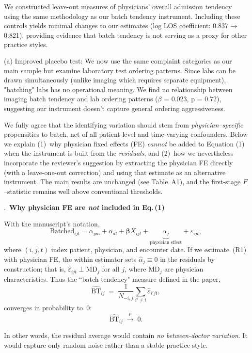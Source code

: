 \documentclass[11pt]{article}
\newcommand{\1}{\hbox{\rm 1\kern-.35em 1}}
\begin{document}
{We constructed leave-out measures of physicians' overall admission tendency using the same methodology as our batch tendency instrument. Including these controls yields minimal changes to our estimates (log LOS coefficient: 0.837 → 0.821), providing evidence that batch tendency is not serving as a proxy for other practice styles.


(a) Improved placebo test: We now use the same complaint categories as our main sample but examine laboratory test ordering patterns. Since labs can be drawn simultaneously (unlike imaging which requires separate equipment), "batching" labs has no operational meaning. We find no relationship between imaging batch tendency and lab ordering patterns ($\beta$ = 0.023, p = 0.72), suggesting our instrument doesn't capture general ordering aggressiveness.

We fully agree that the identifying variation should stem from \emph{physician–specific} propensities to batch, net of all patient-level and time-varying confounders.  
Below we explain (1)~why physician fixed effects (FE) \emph{cannot} be added to Equation (1) when the instrument is built from the \emph{residuals}, and (2)~how we nevertheless incorporate the reviewer’s suggestion by extracting the physician FE directly (with a leave-one-out correction) and using that estimate as an alternative instrument.  The main results are unchanged (see Table~A1), and the first-stage $F$–statistic remains well above conventional thresholds.

\bigskip
{}.\ \textbf{Why physician FE are \emph{not} included in Eq.\,(1)}

With the manuscript’s notation,
\begin{equation}
\text{Batched}_{ijt}= 
      \alpha_{ym}+\alpha_{dt}+ \boldsymbol\beta X_{ijt}
      + \underbrace{\alpha_j}_{\text{physician effect}}
      +\varepsilon_{ijt},
      \tag{R1}
\end{equation}
where $(i,j,t)$ index patient, physician, and encounter date.  If we estimate~(R1) with physician FE, the within estimator sets $\widehat\alpha_j\equiv 0$ in the residuals by construction; that is, $\widehat\varepsilon_{ijt}\perp \text{MD}_j$ for all $j$, where $\text{MD}_j$ are physician characteristics.  Thus the ``batch-tendency" measure defined in the paper,
\[
\widehat{\text{BT}}_{ij}\;=\;
   \frac{1}{N_{-i,j}}\sum_{i'\neq i}\widehat\varepsilon_{i'jt},
\]
converges in probability to~$0$:
\[
\widehat{\text{BT}}_{ij}\;\xrightarrow{p}\;0 .
\]

In other words, the residual average would contain \emph{no between-doctor variation}. It would capture only random noise rather than a stable practice style.

}
\end{document}
